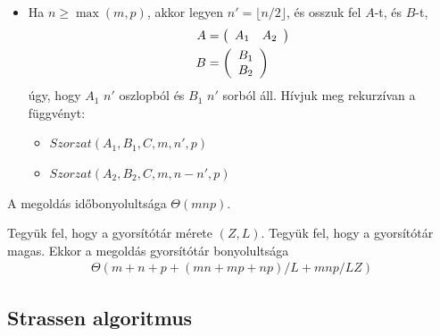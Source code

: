 \documentclass[12pt]{report}
\begin{document}
\begin{itemize}
\item Ha $n \ge \max(m, p)$,
akkor legyen $n'=\lfloor n/2 \rfloor$,
és osszuk fel $A$-t, és $B$-t,
\begin{align*}
A&=\left(
\begin{array}{c c}  
A_{1} & A_{2}
\end{array}
\right) \\
B&=\left(
\begin{array}{c}  
B_{1} \\
B_{2}
\end{array}
\right)
\end{align*}
úgy, hogy $A_1$ $n'$ oszlopból és $B_1$ $n'$ sorból áll.
Hívjuk meg rekurzívan a függvényt:
\begin{itemize}
\item $Szorzat(A_1, B_1, C, m, n', p)$
\item $Szorzat(A_2, B_2, C, m, n-n', p)$
\end{itemize}
\end{itemize}

A megoldás időbonyolultsága $\Theta(mnp)$.

Tegyük fel, hogy a gyorsítótár mérete $(Z, L)$.
Tegyük fel, hogy a gyorsítótár magas.
Ekkor a megoldás gyorsítótár bonyolultsága\cite{prokop}
\begin{align*}
\Theta(m+n+p+(mn+mp+np)/L+mnp/LZ)
\end{align*}

\subsection{Strassen algoritmus}
\end{document}
